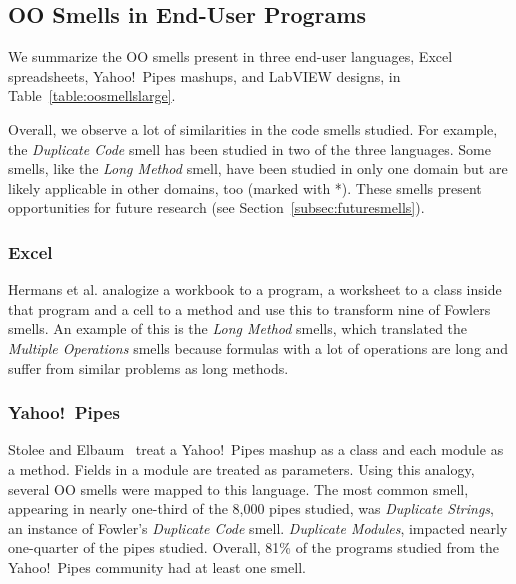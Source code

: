 \documentclass[10pt,conference,compsocconf]{IEEEtran}
\begin{document}
\subsection{OO Smells in End-User Programs}
\label{sec:smells:oo}
 We summarize the OO smells present in  three end-user languages, Excel spreadsheets, Yahoo!\ Pipes mashups, and LabVIEW designs, in Table~\ref{table:oosmellslarge}.
 
 Overall, we observe a lot of similarities in the code smells studied. For example, the \emph{Duplicate Code} smell has been studied in two of the three languages. Some smells, like the \emph{Long Method} smell, have been studied in only one domain but are likely applicable in other domains, too (marked with *). These smells present opportunities for future research (see Section~\ref{subsec:futuresmells}).
 

 \subsubsection{Excel}
Hermans et al. \cite{Hermans2012inter,Hermans2012intra} analogize a workbook to a program, a worksheet to a class inside that program and a cell to a method and use this to transform nine of Fowlers smells.
An example of this is the \emph{Long Method} smells, which translated the \emph{Multiple Operations} smells because formulas with a lot of operations are long and suffer from similar problems as long methods.

\subsubsection{Yahoo!\ Pipes}
Stolee and Elbaum~\cite{Stolee2011, StoleeTSE2013} treat a Yahoo!\ Pipes mashup as a class and each module as a method.  Fields in a module are treated as parameters. Using this analogy,  several OO smells were mapped to this language. The most common smell, appearing in nearly one-third of the 8,000 pipes studied, was \emph{Duplicate Strings}, an instance of Fowler's \emph{Duplicate Code} smell. 
\emph{Duplicate Modules}, impacted nearly one-quarter of the pipes studied. 
 Overall, 81\% of the programs studied from the Yahoo!\ Pipes community had at least one smell. 
 
\end{document}
